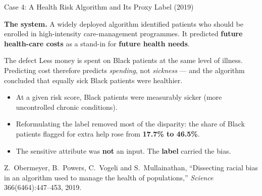 
\begin{frame}[allowframebreaks]{Case 4: A Health Risk Algorithm and Its Proxy Label (2019)}

    \textbf{The system.} A widely deployed algorithm identified patients who should be enrolled in
    high-intensity care-management programmes. It predicted \textbf{future health-care costs} as a
    stand-in for \textbf{future health needs}.

    \vspace{0.8em}

    \begin{block}{The defect}
        Less money is spent on Black patients at the same level of illness. Predicting cost
        therefore predicts \emph{spending}, not \emph{sickness} --- and the algorithm concluded that
        equally sick Black patients were healthier.
    \end{block}

    \vspace{0.8em}

    \begin{itemize}
        \setlength\itemsep{0.4em}
        \item At a given risk score, Black patients were measurably sicker (more uncontrolled
              chronic conditions).
        \item Reformulating the label removed most of the disparity: the share of Black patients
              flagged for extra help rose from \textbf{17.7\% to 46.5\%}.
        \item The sensitive attribute was \textbf{not} an input. The \textbf{label} carried the bias.
    \end{itemize}

    \vspace{0.4em}
    {\scriptsize Z.~Obermeyer, B.~Powers, C.~Vogeli and S.~Mullainathan, ``Dissecting racial bias in
    an algorithm used to manage the health of populations,'' \emph{Science} 366(6464):447--453, 2019.}
\end{frame}
